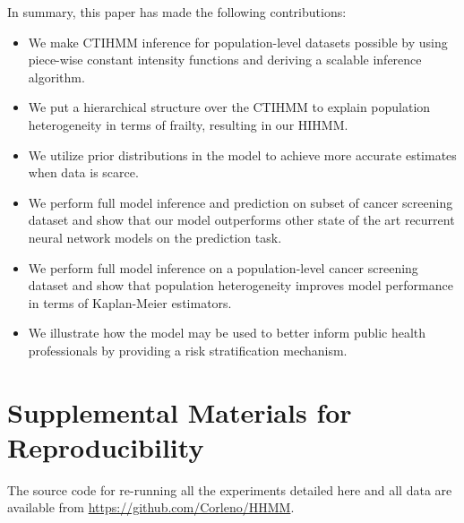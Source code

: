 \documentclass{article}
\begin{document}
In summary, this paper has made the following contributions:
\begin{itemize}
	\item We make CTIHMM inference for population-level datasets possible by using piece-wise constant intensity functions and deriving a scalable inference algorithm.
	\item We put a hierarchical structure over the CTIHMM to explain population heterogeneity in terms of frailty, resulting in our HIHMM.
	\item We utilize prior distributions in the model to achieve more accurate estimates when data is scarce.    
	\item We perform full model inference and prediction on subset of cancer screening dataset and show that our model outperforms other state of the art recurrent neural network models on the prediction task.
	\item We perform full model inference on a population-level cancer screening dataset and show that population heterogeneity improves model performance in terms of Kaplan-Meier estimators. 
	\item We illustrate how the model may be used to better inform public health professionals by providing a risk stratification mechanism. 
\end{itemize}


\newpage



\newpage
\appendix
\section{Supplemental Materials for Reproducibility}
The source code for re-running all the experiments detailed here and all data are available from \url{https://github.com/Corleno/HHMM}.
\end{document}
